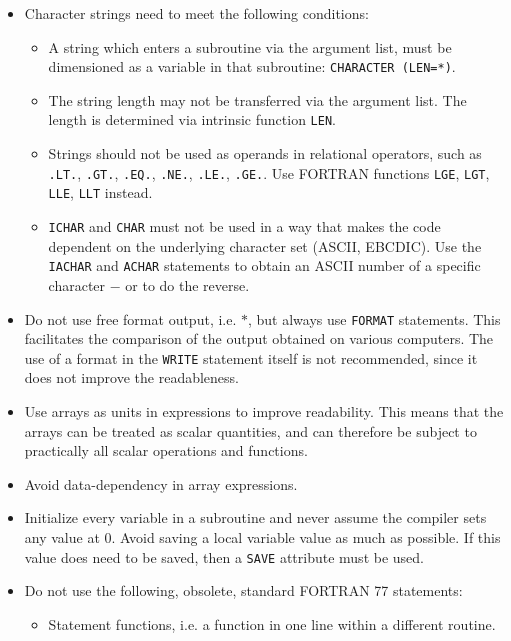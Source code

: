 \documentclass[12pt]{book}
\begin{document}
\begin{itemize}
\begin{itemize}
        \end{itemize}
  \item Character strings need to meet the following conditions:
        \begin{itemize}
          \item A string which enters a subroutine via the argument list, must be dimensioned
                as a variable in that subroutine: {\tt CHARACTER (LEN=*)}.
          \item The string length may not be transferred via the argument list. The length is
                determined via intrinsic function {\tt LEN}.
          \item Strings should not be used as operands in relational operators, such as
                {\tt .LT.}, {\tt .GT.}, {\tt .EQ.}, {\tt .NE.}, {\tt .LE.}, {\tt .GE.}. Use
                FORTRAN functions {\tt LGE}, {\tt LGT}, {\tt LLE}, {\tt LLT} instead.
          \item {\tt ICHAR} and {\tt CHAR} must not be used in a way that makes the code dependent on the
                underlying character set (ASCII, EBCDIC). Use the {\tt IACHAR} and {\tt ACHAR} statements to
                obtain an ASCII number of a specific character $-$ or to do the reverse.
        \end{itemize}
  \item Do not use free format output, i.e. $*$, but always use {\tt FORMAT} statements. This
        facilitates the comparison of the output obtained on various computers. The use of a format
        in the {\tt WRITE} statement itself is not recommended, since it does not improve the
        readableness.
  \item Use arrays as units in expressions to improve readability. This means that the arrays can be treated
        as scalar quantities, and can therefore be subject to practically all scalar operations and functions.
  \item Avoid data-dependency in array expressions.
  \item Initialize every variable in a subroutine and never assume the compiler sets any value at 0. Avoid saving
        a local variable value as much as possible. If this value does need to be saved, then a {\tt SAVE} attribute
        must be used.
  \item Do not use the following, obsolete, standard FORTRAN 77 statements:
        \begin{itemize}
          \item Statement functions, i.e. a function in one line within a different routine.

\end{itemize}
\end{itemize}
\end{document}
